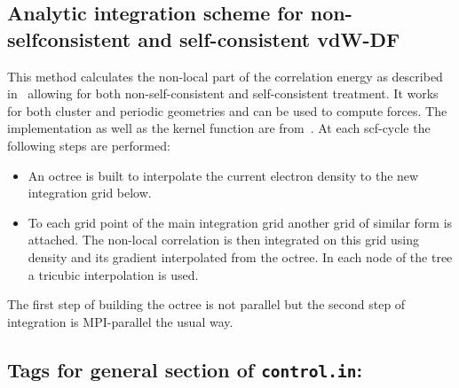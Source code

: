 \newpage

\subsection{Analytic integration scheme for non-selfconsistent and
  self-consistent vdW-DF}
\label{vdwdf-TKK}

This method calculates the non-local part of the correlation energy as
described in~\cite{Dion04} allowing for both non-self-consistent and
self-consistent treatment. It works for both cluster and periodic
geometries and can be used to compute forces. The implementation as
well as the kernel function are from~\cite{Gulans09}. At each
scf-cycle the following steps are performed:
\begin{itemize}
\item An octree is built to interpolate the current electron density
  to the new integration grid below.
\item To each grid point of the main integration grid another grid of
  similar form is attached. The non-local correlation is then
  integrated on this grid using density and its gradient interpolated
  from the octree. In each node of the tree a tricubic interpolation
  is used.
\end{itemize}
The first step of building the octree is not parallel but the second
step of integration is MPI-parallel the usual way.

\newpage

\subsection*{Tags for general section of \texttt{control.in}:}


